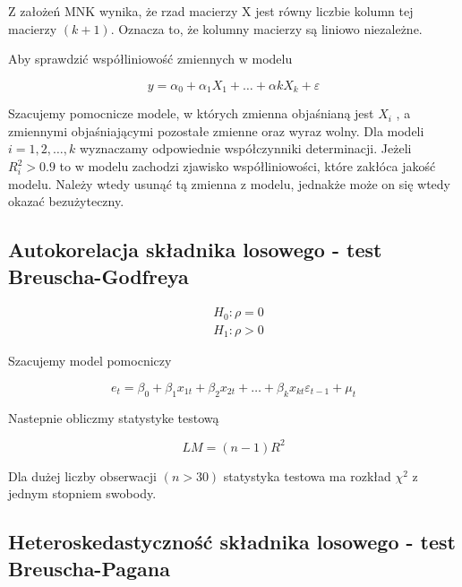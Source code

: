 Z założeń MNK wynika, że rzad macierzy X jest równy liczbie kolumn tej macierzy \((k+1)\).
Oznacza to, że kolumny macierzy są liniowo niezależne.

Aby sprawdzić współliniowość zmiennych w modelu

\begin{equation}
    y = \alpha_{0} + \alpha_{1}X_{1} + \dots + \alpha{k}X_{k} + \varepsilon
\end{equation}

Szacujemy pomocnicze modele, w których zmienna objaśnianą jest \(X_i\) , a zmiennymi objaśniającymi pozostałe zmienne oraz wyraz wolny.
Dla modeli \(i=1,2, \dots ,k \) wyznaczamy odpowiednie współczynniki determinacji.
Jeżeli \(R_{i}^{2} > 0.9\) to w modelu zachodzi zjawisko współliniowości, które zakłóca jakość modelu.
Należy wtedy usunąć tą zmienna z modelu, jednakże może on się wtedy okazać bezużyteczny.

\subsection{Autokorelacja składnika losowego - test Breuscha-Godfreya}\label{subsec:autokorelacja-składnika-losowego}

\begin{equation}
    \begin{split}
        &H_0: \rho = 0 \\
        &H_1: \rho > 0
    \end{split}
\end{equation}

Szacujemy model pomocniczy

\begin{equation}
    e_{t} = \beta_{0} + \beta_{1}x_{1t} + \beta_{2}x_{2t} + \dots + \beta_{k}x_{kt}\varepsilon_{t-1} + \mu_{t}
\end{equation}

Nastepnie obliczmy statystyke testową

\begin{equation}
    LM = (n-1)R^2
\end{equation}

Dla dużej liczby obserwacji \((n > 30)\) statystyka testowa ma rozkład \(\chi^2\) z jednym stopniem swobody.

\subsection{Heteroskedastyczność składnika losowego - test Breuscha-Pagana}\label{subsec:heteroskedastyczność-składnika-losowego}

